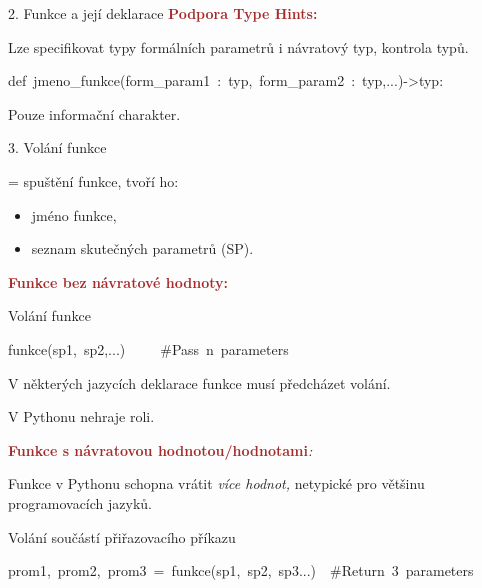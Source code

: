 \documentclass[czech]{beamer}
\newenvironment{lyxcode}
  {\par\begin{list}{}{
    \setlength{\rightmargin}{\leftmargin}
    \setlength{\listparindent}{0pt}%
    \raggedright
    \setlength{\itemsep}{0pt}
    \setlength{\parsep}{0pt}
    \normalfont\ttfamily}%
   \def\{{\char`\{}
   \def\}{\char`\}}
   \def\textasciitilde{\char`\~}
   \item[]}
  {\end{list}}
\begin{document}
\begin{frame}{2. Funkce a její deklarace}
{\scriptsize\bigskip{}
}{\scriptsize\textbf{\textcolor{brown}{Podpora Type Hints: }}}{\scriptsize\par}

{\scriptsize Lze specifikovat typy formálních parametrů i návratový
typ, kontrola typů. }{\scriptsize\par}
\begin{lyxcode}
{\scriptsize def~jmeno\_funkce(form\_param1~:~typ,~form\_param2~:~typ,...)->typ:~\medskip{}
}{\scriptsize\par}
\end{lyxcode}
{\scriptsize Pouze informační charakter.}{\scriptsize\par}
\end{frame}

\begin{frame}{3. Volání funkce}

{\tiny = spuštění funkce, tvoří ho:}{\tiny\par}
\begin{itemize}
\item {\tiny jméno funkce, }{\tiny\par}
\item {\tiny seznam skutečných parametrů (SP).}{\tiny\par}
\end{itemize}
{\tiny\textbf{\textcolor{brown}{Funkce bez návratové hodnoty:}}}{\tiny\par}

{\tiny Volání funkce}{\tiny\par}
\begin{lyxcode}
{\tiny funkce(sp1,~sp2,...)~~~~~\#Pass~n~parameters}{\tiny\par}
\end{lyxcode}
{\tiny V některých jazycích deklarace funkce musí předcházet volání.}{\tiny\par}

{\tiny V Pythonu nehraje roli.\medskip{}
}{\tiny\par}

{\tiny\textbf{\textcolor{brown}{Funkce s návratovou hodnotou/hodnotami}}}{\tiny\emph{:}}{\tiny\par}

{\tiny Funkce v Pythonu schopna vrátit }{\tiny\emph{více hodnot, }}{\tiny netypické
pro většinu programovacích jazyků.}{\tiny\par}

{\tiny Volání součástí přiřazovacího příkazu}{\tiny\par}
\begin{lyxcode}
{\tiny prom1,~prom2,~prom3~=~funkce(sp1,~sp2,~sp3...)~~\#Return~3~parameters}{\tiny\par}


\end{lyxcode}
\end{frame}
\end{document}
